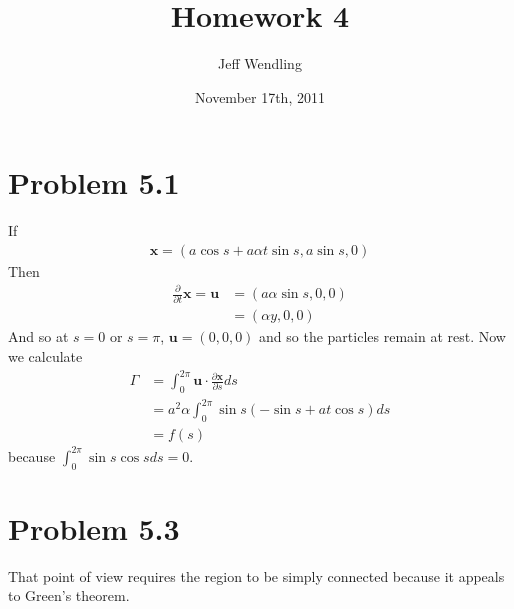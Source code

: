 \documentclass[12pt]{article}
\title{Homework 4}
\author{Jeff Wendling}
\date{November 17th, 2011}
\newcommand{\eq}[1]{\begin{align*}#1\end{align*}}
\newcommand{\p}[2]{\frac{\partial#1}{\partial#2}}
\begin{document}
\maketitle
\section*{Problem 5.1}
If
\eq{
	\bm{x} = (a\cos s + a\alpha t\sin s, a \sin s, 0)
}
Then
\eq{
	\p{}{t}\bm{x} = \bm{u} &= (a\alpha\sin s, 0, 0)\\
	&= (\alpha y, 0, 0)
}
And so at $s = 0$ or $s = \pi$, $\bm{u} = (0, 0, 0)$ and so the particles remain at rest.
Now we calculate
\eq{
	\Gamma &= \int_0^{2\pi} \bm{u}\cdot \p{\bm{x}}{s} ds\\
	&= a^2\alpha \int_0^{2\pi} \sin s(-\sin s + at\cos s)ds\\
	&= f(s)
}
because $\int_0^{2\pi} \sin s \cos s ds = 0$.
\section*{Problem 5.3}
That point of view requires the region to be simply connected because it appeals to Green's theorem.
\end{document}
